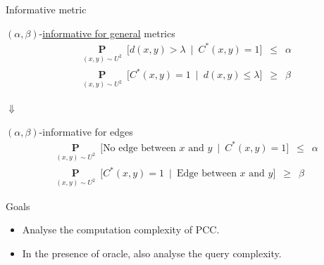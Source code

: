 \documentclass{beamer}
\newcommand{\mb}{\mathbf}
\begin{document}
\begin{frame}[label=informativeMetric]{Informative metric}
	\begin{block}{$(\alpha, \beta)$-\hyperlink{notesInformativeMetric}{informative for general} metrics}		
		\vspace{-10pt}\begin{align*}
			&\underset{(x, y) \sim U^2}{\mb P}\enspace \big[ d(x, y) > \lambda \enspace|\enspace C^*(x, y) = 1\big] \enspace \le \enspace \alpha \\
			&\underset{(x, y) \sim U^2}{\mb P}\enspace \big[C^*(x, y) = 1 \enspace|\enspace d(x, y) \le \lambda \big] \enspace \ge \enspace \beta 
		\end{align*}
	\end{block}	
	
	\begin{center}$\Downarrow$\end{center}
	
	\begin{block}{$(\alpha, \beta)$-informative for edges}		
		\vspace{-10pt}\begin{align*}
			&\underset{(x, y) \sim U^2}{\mb P}\enspace \big[ \text{No edge between $x$ and $y$} \enspace|\enspace C^*(x, y) = 1\big] \enspace \le \enspace \alpha \\
			&\underset{(x, y) \sim U^2}{\mb P}\enspace \big[C^*(x, y) = 1 \enspace|\enspace \text{Edge between $x$ and $y$}  \big] \enspace \ge \enspace \beta 
		\end{align*}
	\end{block}	

\end{frame}

\begin{frame}{Goals}

	\begin{itemize}
		\item Analyse the computation complexity of PCC.
		\vspace{30pt}\item In the presence of oracle, also analyse the query complexity.
	\end{itemize}	 
\end{frame}
\end{document}
